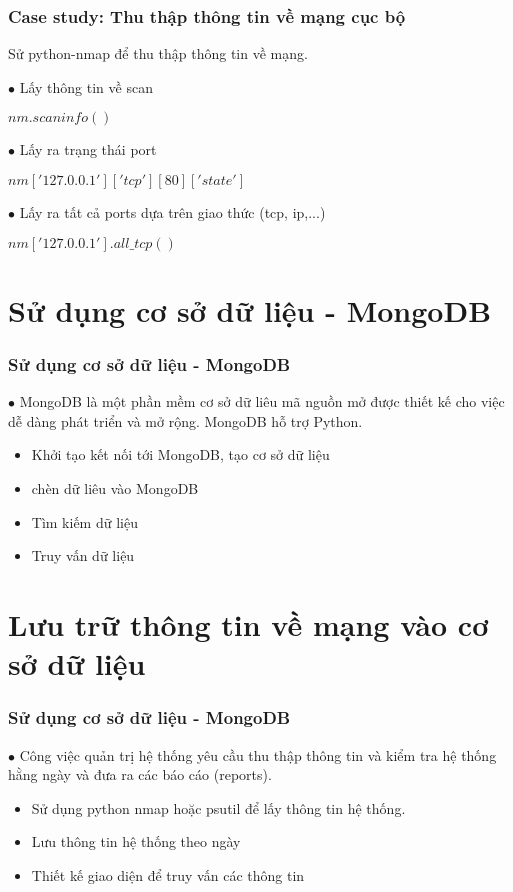 \documentclass{beamer}
\begin{document}
\begin{frame}[label=vidunmap]
\frametitle{Case study: Thu thập thông tin về mạng cục bộ}
Sử python-nmap để thu thập thông tin về mạng. 

$\bullet$ Lấy thông tin về scan
\begin{example}
$nm.scaninfo()$
\end{example}
$\bullet$ Lấy ra trạng thái port 
\begin{example}
$nm['127.0.0.1']['tcp'][80]['state'] $
\end{example}
$\bullet$ Lấy ra tất cả ports dựa trên giao thức (tcp, ip,...) 
\begin{example}
$nm['127.0.0.1'].all\_tcp() $
\end{example}

\hyperlink{teptin}{}
\end{frame}

\section{Sử dụng cơ sở dữ liệu - MongoDB}
\begin{frame}[label=cosodulieu]
\frametitle{Sử dụng cơ sở dữ liệu - MongoDB}
$\bullet$ MongoDB là một phần mềm cơ sở dữ liêu mã nguồn mở được thiết kế cho việc dễ dàng phát triển và mở rộng. MongoDB hỗ trợ Python.
\begin{itemize}
\item Khởi tạo kết nối tới MongoDB, tạo cơ sở dữ liệu
\item chèn dữ liêu vào MongoDB
\item Tìm kiếm dữ liệu
\item Truy vấn dữ liệu
\end{itemize}

\hyperlink{teptin}{}
\end{frame}

\section{Lưu trữ thông tin về mạng vào cơ sở dữ liệu}
\begin{frame}[label=tonghop]
\frametitle{Sử dụng cơ sở dữ liệu - MongoDB}
$\bullet$ Công việc quản trị hệ thống yêu cầu thu thập thông tin và kiểm tra hệ thống hằng ngày và đưa ra các báo cáo (reports).
\begin{itemize}
\item Sử dụng python nmap hoặc psutil để lấy thông tin hệ thống.
\item Lưu thông tin hệ thống theo ngày
\item Thiết kế giao diện để truy vấn các thông tin
\end{itemize}

\hyperlink{teptin}{}
\end{frame}




\end{document}
